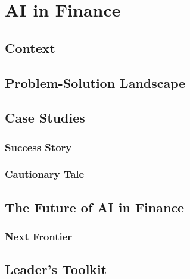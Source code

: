 \chapter{AI in Finance}
\label{chap:ai_in_finance}

\section{Context}
\label{sec:finance_context}

\section{Problem-Solution Landscape}
\label{sec:finance_problem_solution}

\section{Case Studies}
\label{sec:finance_case_studies}
\subsection{Success Story}
\label{sec:finance_success_story}
\subsection{Cautionary Tale}
\label{sec:finance_cautionary_tale}

\section{The Future of AI in Finance}
\label{sec:future_of_ai_in_finance}
\subsection{Next Frontier}
\label{sec:finance_next_frontier}

\section{Leader's Toolkit}
\label{sec:finance_leaders_toolkit}